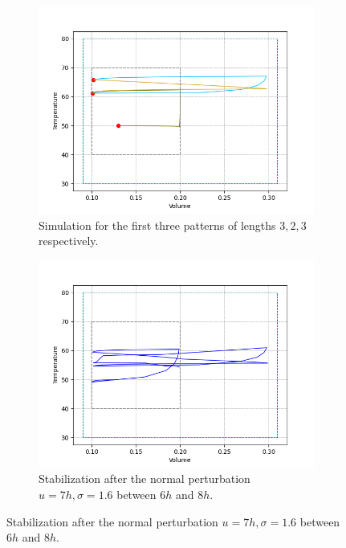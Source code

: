       \begin{figure}[!htb]        
        \begin{subfigure}{0.51\textwidth}
          \includegraphics[width=1.0\linewidth]{images/safe_post_pattern.png}
          \captionsetup{format=hang}
          \caption{Simulation for the first three patterns of lengths $3,2,3$ respectively.} 
          \label{fig:safepostpattern}
        \end{subfigure}
        \hspace*{\fill}
        \begin{subfigure}{0.51\textwidth}
          \includegraphics[width=1.0\linewidth]{images/safe_post_pattern_perturb.png}
          \captionsetup{format=hang}
          \caption{Stabilization after the normal perturbation $u=7h,\sigma=1.6$ between $6h$ and $8h$.} 
          \label{fig:safepostpatternperturbation}
        \end{subfigure}%
      \end{figure}

